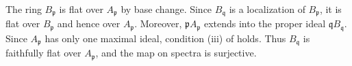 The ring $B_{\mathfrak p}$ is flat over $A_{\mathfrak p}$ by base change. Since $B_{\mathfrak q}$ is a localization of $B_{\mathfrak p}$, it is flat over $B_{\mathfrak p}$ and hence over $A_{\mathfrak p}$. Moreover, $\mathfrak pA_{\mathfrak p}$ extends into the proper ideal $\mathfrak qB_{\mathfrak q}$. Since $A_{\mathfrak p}$ has only one maximal ideal, condition (iii) of  holds. Thus $B_{\mathfrak q}$ is faithfully flat over $A_{\mathfrak p}$, and the map on spectra is surjective.
